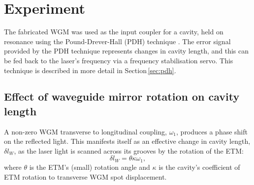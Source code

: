 \section{Experiment}

The fabricated \gls{WGM} was used as the input coupler for a \FP{} cavity, held on resonance using the Pound-Drever-Hall (\gls{PDH}) technique \cite{Drever1983}. The error signal provided by the \gls{PDH} technique represents changes in cavity length, and this can be fed back to the laser's frequency via a frequency stabilisation servo. This technique is described in more detail in Section\,\ref{sec:pdh}.

\subsection{Effect of waveguide mirror rotation on cavity length}
\label{sec:lengthsignals}

A non-zero \gls{WGM} transverse to longitudinal coupling, $\omega_1$, produces a phase shift on the reflected light. This manifests itself as an effective change in cavity length, $\delta l_W$, as the laser light is scanned across its grooves by the rotation of the \gls{ETM}:
\begin{equation}
  \label{eq:wgm-length-change}
  \delta l_W = \theta \kappa \omega_1,
\end{equation}
where $\theta$ is the \gls{ETM}'s (small) rotation angle and $\kappa$ is the cavity's coefficient of \gls{ETM} rotation to transverse \gls{WGM} spot displacement.


